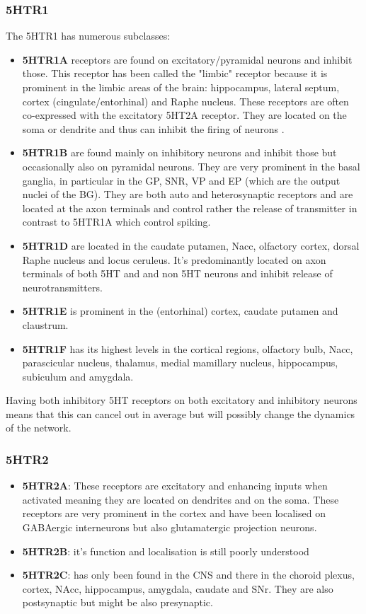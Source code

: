 \documentclass[12pt,a4paper]{article}
\begin{document}
\subsubsection{5HTR1}
The 5HTR1 has numerous subclasses:
\begin{itemize}
  \item \textbf{5HTR1A} receptors are found on excitatory/pyramidal neurons and
    inhibit those. This receptor has been called the "limbic" receptor
    because it is prominent in the limbic areas of the brain:
    hippocampus, lateral septum, cortex (cingulate/entorhinal) and
    Raphe nucleus. These receptors are often co-expressed with the
    excitatory 5HT2A receptor. They are located on the soma or
    dendrite and thus can inhibit the firing of neurons
    \citep{Riad2000}.
  \item \textbf{5HTR1B} are found mainly on inhibitory neurons and inhibit
    those but occasionally also on pyramidal neurons. They are very
    prominent in the basal ganglia, in particular in the GP, SNR, VP
    and EP (which are the output nuclei of the BG). They are both auto
    and heterosynaptic receptors and are located at the axon terminals
    \citep{Riad2000} and control rather the release of transmitter in
    contrast to 5HTR1A which control spiking.
  \item \textbf{5HTR1D} are located in the caudate putamen, Nacc, olfactory
    cortex, dorsal Raphe nucleus and locus ceruleus. It's
    predominantly located on axon terminals of both 5HT and and non
    5HT neurons and inhibit release of neurotransmitters.
  \item \textbf{5HTR1E} is prominent in the (entorhinal) cortex, caudate
    putamen and claustrum.
  \item \textbf{5HTR1F} has its highest levels in the cortical regions,
    olfactory bulb, Nacc, parascicular nucleus, thalamus, medial
    mamillary nucleus, hippocampus, subiculum and amygdala.
\end{itemize}

Having both inhibitory 5HT receptors on both excitatory and inhibitory
neurons means that this can cancel out in average but will possibly
change the dynamics of the network.

\subsubsection{5HTR2}
\begin{itemize}
  \item \textbf{5HTR2A}: These receptors are excitatory and enhancing
    inputs when activated meaning they are located on dendrites and on
    the soma. These receptors are very prominent in the cortex and
    have been localised on GABAergic interneurons but also
    glutamatergic projection neurons.
  \item \textbf{5HTR2B}: it's function and localisation is still
    poorly understood
  \item \textbf{5HTR2C}: has only been found in the CNS and there in
    the choroid plexus, cortex, NAcc, hippocampus, amygdala, caudate
    and SNr. They are also postsynaptic but might be also presynaptic.
\end{itemize}
\end{document}
